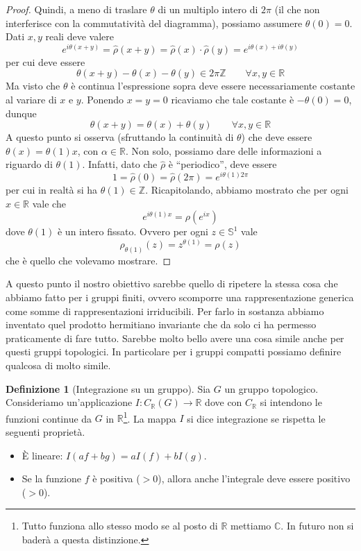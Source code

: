 \documentclass[11pt]{article}
\theoremstyle{plain}
\theoremstyle{definition}
\newtheorem{defn}{Definizione}[section]
\theoremstyle{remark}
\newcommand{\C}{\mathbb{C}}
\newcommand{\R}{\mathbb{R}}
\newcommand{\Z}{\mathbb{Z}}
\begin{document}
\begin{proof}
Quindi, a meno di traslare $\theta$ di un multiplo intero di $2\pi$ (il che non interferisce con la commutatività del diagramma), possiamo assumere $\theta(0) = 0$. Dati $x,y$ reali deve valere
\[ e^{i\theta(x+y)} = \hat \rho(x+y) = \hat \rho(x )\cdot \hat \rho(y) = e^{i\theta(x)+i \theta(y)}\]
per cui deve essere
\[ \theta(x+y) - \theta(x) - \theta(y) \in 2\pi \Z \qquad \forall x, y \in \R \]
Ma visto che $\theta$ è continua l'espressione sopra deve essere necessariamente costante al variare di $x$ e $y$. Ponendo $x=y=0$ ricaviamo che tale costante è $-\theta(0)=0$, dunque
\[ \theta(x + y) = \theta(x ) + \theta (y) \qquad \forall x,y\in \R\]
A questo punto si osserva (sfruttando la continuità di $\theta$) che deve essere $\theta(x) = \theta(1) x$, con $\alpha \in \R$. Non solo, possiamo dare delle informazioni a riguardo di $\theta(1)$. Infatti, dato che $\hat\rho$ è ``periodico'', deve essere
\[ 1 = \hat\rho(0) = \hat\rho(2\pi) = e^{i\theta(1) 2\pi}\]
per cui in realtà si ha $\theta(1) \in \Z$.
Ricapitolando, abbiamo mostrato che per ogni $x\in\R$ vale che
\[e^{i \theta(1)x} = \rho(e^{ix}) \]
dove $\theta(1)$ è un intero fissato. Ovvero per ogni $z\in\mathbb{S}^1$ vale
\[ \rho_{\theta(1)}(z) = z^{\theta(1)} = \rho(z) \]
che è quello che volevamo mostrare.

\end{proof}

A questo punto il nostro obiettivo sarebbe quello di ripetere la stessa cosa che abbiamo fatto per i gruppi finiti, ovvero scomporre una rappresentazione generica come somme di rappresentazioni irriducibili. Per farlo in sostanza abbiamo inventato quel prodotto hermitiano invariante che da solo ci ha permesso praticamente di fare tutto. Sarebbe molto bello avere una cosa simile anche per questi gruppi topologici. In particolare per i gruppi compatti possiamo definire qualcosa di molto simile.


\begin{defn}[Integrazione su un gruppo]
Sia $G$ un gruppo topologico. Consideriamo un'applicazione $I: C_{\R}(G) \to \R$
dove con $C_\R$ si intendono le funzioni continue da $G$ in $\R$\footnote{Tutto funziona allo stesso modo se al posto di $\R$ mettiamo $\C$. In futuro non si baderà a questa distinzione.}. La mappa $I$ si dice integrazione se rispetta le seguenti proprietà.
\begin{itemize}
\item \`E lineare: $I(a f + b g) = aI(f) + bI(g)$.
\item Se la funzione $f$ è positiva ($ > 0$), allora anche l'integrale deve essere positivo ($> 0$).
\end{itemize}
\end{defn}
\end{document}
